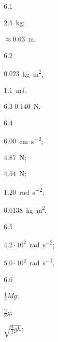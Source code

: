 \protect \section *{\protect {}}
\begin{Solution}{6.{1}}
		\begin{enumerate*}[label=(\alph*)]
			\item $2.5$~\si{\kilo\gram};
			\item $\approx 0.63$~\si{\meter}.
		\end{enumerate*}
	
\end{Solution}
\begin{Solution}{6.{2}}
		\begin{enumerate*}[label=(\alph*)]
			\item $0.023$~\si{\kilo\gram\square\meter},
			\item $1.1$~\si{\milli\joule}.
		\end{enumerate*}
	
\end{Solution}
\begin{Solution}{6.{3}}
		$0.140$~\si{\newton}.
	
\end{Solution}
\begin{Solution}{6.{4}}
		\begin{enumerate*}[label=(\alph*)]
			\item $6.00$~\si{\centi\meter\per\square\second};
			\item $4.87$~\si{\newton};
			\item $4.54$~\si{\newton};
			\item $1.20$~\si{\radian\per\square\second};
			\item $0.0138$~\si{\kilo\gram\square\meter}.
		\end{enumerate*}
	
\end{Solution}
\begin{Solution}{6.{5}}
		\begin{enumerate*}[label=(\alph*)]
			\item $4.2 \cdot 10^2$~\si{\radian\per\square\second};
			\item $5.0 \cdot  10^2$~\si{\radian\per\second}.
		\end{enumerate*}
	
\end{Solution}
\begin{Solution}{6.{6}}
		\begin{enumerate*}[label=(\alph*)]
			\item $\frac13Mg$;
			\item $\frac23 g$;
			\item $\sqrt{\frac43 gh}$;
		\end{enumerate*}
	
\end{Solution}
